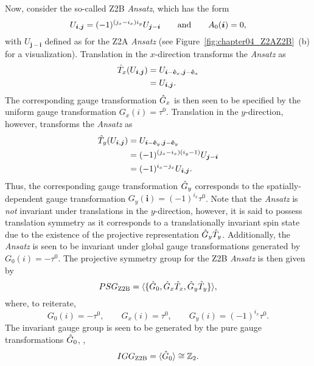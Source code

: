 Now, consider the so-called Z2B \textit{Ansatz}, which has the form~\cite{WenPLA2002}
%
\begin{equation}
	U_{\bm{i},\bm{j}} = (-1)^{(j_x-i_x) i_y} U_{\bm{j}-\bm{i}} \qquad {\rm and } \qquad A_0(\bm{i}) = 0,
\end{equation}
%
with $U_{\bm{j}-\bm{i}}$ defined as for the Z2A \textit{Ansatz} (see Figure~\ref{fig:chapter04_Z2AZ2B}~(b) for a visualization).
Translation in the $x$-direction transforms the \textit{Ansatz} as
%
\begin{align}
	\hat{T}_x(U_{\bm{i},\bm{j}}) &= U_{\bm{i}-\mathbf{\hat{e}}_x,\bm{j}-\mathbf{\hat{e}}_x} \nonumber\\
								&= U_{\bm{i},\bm{j}}.
\end{align}
%
The corresponding gauge transformation $\hat{G}_x$ is then seen to be specified by the uniform gauge transformation $G_x(i) = \tau^0$.
Translation in the $y$-direction, however, transforms the \textit{Ansatz} as
%
\begin{align}
	\hat{T}_y(U_{\bm{i},\bm{j}}) &= U_{\bm{i}-\mathbf{\hat{e}}_y,\bm{j}-\mathbf{\hat{e}}_y} \nonumber\\
								&= (-1)^{(j_x-i_x)(i_y - 1)} U_{\bm{j}-\bm{i}} \nonumber\\
								&= (-1)^{i_x-j_x} U_{\bm{i},\bm{j}}.
\end{align}
%
Thus, the corresponding gauge transformation $\hat{G}_y$ corresponds to the spatially-dependent gauge transformation $G_y(\bm{i}) = (-1)^{i_x} \tau^0$.
Note that the \textit{Ansatz} is \textit{not} invariant under translations in the $y$-direction, however, it is said to possess translation symmetry as it corresponds to a translationally invariant spin state due to the existence of the projective representation $\hat{G}_y \hat{T}_y$.
Additionally, the \textit{Ansatz} is seen to be invariant under global gauge transformations generated by $G_0(i) = -\tau^0$.
The projective symmetry group for the Z2B \textit{Ansatz} is then given by
%
\begin{equation}
	PSG_{\rm Z2B} = \langle \{ \hat{G}_0, \hat{G}_x \hat{T}_x, \hat{G}_y \hat{T}_y \} \rangle,
\end{equation}
%
where, to reiterate,
%
\begin{equation}
	G_0(i) = -\tau^0, \qquad G_x(i) = \tau^0, \qquad G_y(i) = (-1)^{i_x} \tau^0.
\end{equation}
%
The invariant gauge group is seen to be generated by the pure gauge transformations $\hat{G}_0$, \ie,
%
\begin{equation}
	IGG_{\rm Z2B} =  \langle \hat{G}_0 \rangle \cong \mathbb{Z}_{2}.
\end{equation}
%

